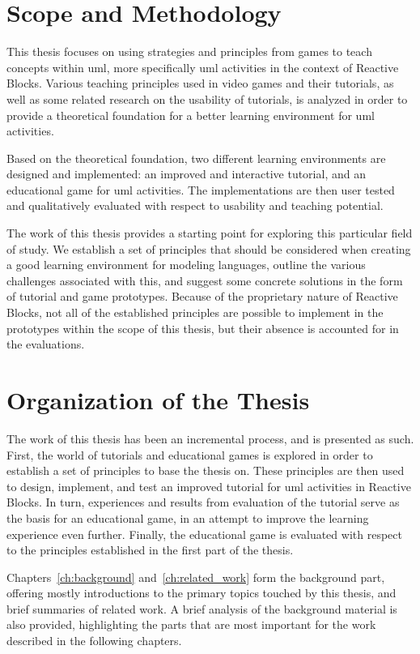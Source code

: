 \section{Scope and Methodology}
\label{sec:scope}
This thesis focuses on using strategies and principles from games to teach concepts within \gls{uml}, more specifically \gls{uml} activities in the context of Reactive Blocks. Various teaching principles used in video games and their tutorials, as well as some related research on the usability of tutorials, is analyzed in order to provide a theoretical foundation for a better learning environment for \gls{uml} activities.

\noindent
Based on the theoretical foundation, two different learning environments are designed and implemented: an improved and interactive tutorial, and an educational game for \gls{uml} activities. The implementations are then user tested and qualitatively evaluated with respect to usability and teaching potential.

\noindent
The work of this thesis provides a starting point for exploring this particular field of study. We establish a set of principles that should be considered when creating a good learning environment for modeling languages, outline the various challenges associated with this, and suggest some concrete solutions in the form of tutorial and game prototypes. Because of the proprietary nature of Reactive Blocks, not all of the established principles are possible to implement in the prototypes within the scope of this thesis, but their absence is accounted for in the evaluations.

\section{Organization of the Thesis}
\label{sec:organization}
The work of this thesis has been an incremental process, and is presented as such. First, the world of tutorials and educational games is explored in order to establish a set of principles to base the thesis on. These principles are then used to design, implement, and test an improved tutorial for \gls{uml} activities in Reactive Blocks. In turn, experiences and results from evaluation of the tutorial serve as the basis for an educational game, in an attempt to improve the learning experience even further. Finally, the educational game is evaluated with respect to the principles established in the first part of the thesis.

\noindent
Chapters~\ref{ch:background} and~\ref{ch:related_work} form the background part, offering mostly introductions to the primary topics touched by this thesis, and brief summaries of related work. A brief analysis of the background material is also provided, highlighting the parts that are most important for the work described in the following chapters.

